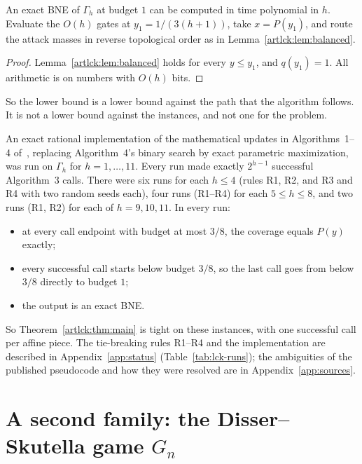 \begin{proposition}\label{artlck:prop:easy}
\statusrefereed
An exact BNE of $\Gamma_h$ at budget $1$ can be computed in time polynomial in $h$. Evaluate the $O(h)$
gates at $y_1=1/(3(h+1))$, take $x=P(y_1)$, and route the attack masses in reverse topological order as in
Lemma~\ref{artlck:lem:balanced}.
\end{proposition}

\begin{proof}
Lemma~\ref{artlck:lem:balanced} holds for every $y\le y_1$, and $q(y_1)=1$. All arithmetic is on numbers
with $O(h)$ bits.
\end{proof}

So the lower bound is a lower bound against the path that the algorithm follows. It is not a lower bound
against the instances, and not one for the problem.

\begin{proposition}\label{artlck:prop:impl}
\statusrefereed
An exact rational implementation of the mathematical updates in Algorithms~1--4 of~\cite{lck16},
replacing Algorithm~4's binary search by exact parametric maximization, was run on $\Gamma_h$ for
$h=1,\dots,11$. Every run made exactly $2^{h-1}$ successful Algorithm~3 calls. There were six runs for
each $h\le4$ (rules R1, R2, and R3 and R4 with two random seeds each), four runs (R1--R4) for each
$5\le h\le8$, and two runs (R1, R2) for each of $h=9,10,11$. In every run:
\begin{itemize}[nosep]
\item at every call endpoint with budget at most $3/8$, the coverage equals $P(y)$ exactly;
\item every successful call starts below budget $3/8$, so the last call goes from below $3/8$ directly to
budget $1$;
\item the output is an exact BNE.
\end{itemize}
\end{proposition}

So Theorem~\ref{artlck:thm:main} is tight on these instances, with one successful call per affine piece.
The tie-breaking rules R1--R4 and the implementation are described in Appendix~\ref{app:status}
(Table~\ref{tab:lck-runs}); the ambiguities of the published pseudocode and how they were resolved are in
Appendix~\ref{app:sources}.

\section{A second family: the Disser--Skutella game \texorpdfstring{$G_n$}{G\_n}}\label{artlck:sec:gn}

